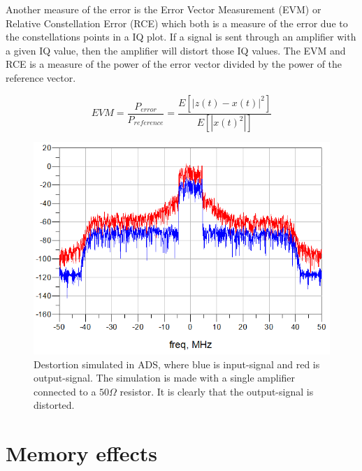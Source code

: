 Another measure of the error is the Error Vector Measurement (EVM) or  Relative Constellation Error (RCE) which both is a measure of the error due to the constellations points in a IQ plot. If a signal is sent through an amplifier with a given IQ value, then the amplifier will distort those IQ values. The EVM and RCE is a measure of the power of the error vector divided by the power of the reference vector. \citep{ali2016}

\begin{equation} \label{eq:evm}
	EVM = \frac{P_{error}}{P_{reference}} = \frac{E[|z(t)-x(t)|^2]}{E[|x(t)^2|]}
\end{equation}  
 
\begin{figure}[H]
\centering 
\includegraphics[scale = 0.5]{figures/ch1/ads_nonlin_dest.png}
\caption{Destortion simulated in ADS, where blue is input-signal and red is output-signal. The simulation is made with a single amplifier connected to a $50\Omega$ resistor. It is clearly that the output-signal is distorted.}
\label{fig:pre_cons}
\end{figure}

\section{Memory effects}

